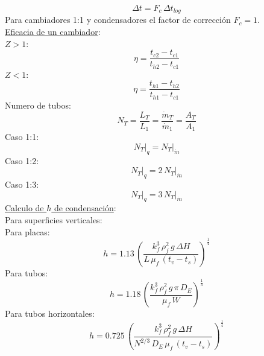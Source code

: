 \documentclass[letter,oneside,10pt]{article}
\begin{document}
\begin{multicols}{3}
\begin{equation*}
    \Delta t = F_c\,\Delta t_{log}
\end{equation*}
Para cambiadores 1:1 y condensadores el factor de corrección $F_c = 1$.\\
\underline{Eficacia de un cambiador}:\\
$Z > 1$:
\vspace{-0.2cm}
\begin{equation*}
    \eta = \frac{t_{c2} - t_{c1}}{t_{h2} - t_{c1}}
\end{equation*}
$Z < 1$:
\vspace{-0.3cm}
\begin{equation*}
    \eta = \frac{t_{h1} - t_{h2}}{t_{h1} - t_{c1}}
\end{equation*}
Numero de tubos:
\vspace{-0.3cm}
\begin{equation*}
    N_T = \frac{L_T}{L_1}
        = \frac{\dot{m}_T}{\dot{m}_1}
        = \frac{A_T}{A_1}
\end{equation*}
Caso 1:1:
\vspace{-0.3cm}
\begin{equation*}
    N_T\Biggr|_q = N_T\Biggr|_{\dot{m}}
\end{equation*}
Caso 1:2:
\vspace{-0.3cm}
\begin{equation*}
    N_T\Biggr|_q = 2\,N_T\Biggr|_{\dot{m}}
\end{equation*}
Caso 1:3:
\vspace{-0.3cm}
\begin{equation*}
    N_T\Biggr|_q = 3\,N_T\Biggr|_{\dot{m}}
\end{equation*}
\underline{Calculo de $h$ de condensación}:\\
Para superficies verticales:\\
Para placas:
\vspace{-0.3cm}
\begin{equation*}
    h = 1.13\,\left(\frac{k_f^3\,\rho_f^2\,g\,\Delta H}{L\,\mu_f\,(t_v - t_s)}\right)^{\frac{1}{4}}
\end{equation*}
Para tubos:
\vspace{-0.3cm}
\begin{equation*}
    h = 1.18\,\left(\frac{k_f^3\,\rho_f^2\,g\,\pi\,D_E}{\mu_f\,W}\right)^{\frac{1}{3}}
\end{equation*}
Para tubos horizontales:
\vspace{-0.3cm}
\begin{equation*}
    h = 0.725\,\left(\frac{k_f^3\,\rho_f^2\,g\,\Delta H}{N^{2/3}\,D_E\,\mu_f\,(t_v - t_s)}\right)^{\frac{1}{4}}

\end{equation*}
\end{multicols}
\end{document}
